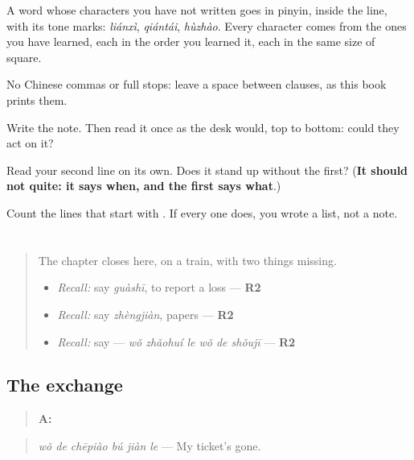 A word whose characters you have not written goes in pinyin, inside the line, with its tone marks: \emph{liánxì}, \emph{qiántái}, \emph{hùzhào}. Every character comes from the ones you have learned, each in the order you learned it, each in the same size of square.

No Chinese commas or full stops: leave a space between clauses, as this book prints them.

Write the note. Then read it once as the desk would, top to bottom: could they act on it?

\begin{tcolorbox}[breakable,colback=teal!4,colframe=teal!35!black,title={Before you move on}]
Read your second line on its own. Does it stand up without the first? (\textbf{It should not quite: it says when, and the first says what}.)

Count the lines that start with . If every one does, you wrote a list, not a note.
\end{tcolorbox}
\section[Practice]{}

\label{lesson:ZH-C285-practice}



\begin{quote}
The chapter closes here, on a train, with two things missing.

\begin{itemize}
\raggedright
  \item \emph{Recall:} say \emph{guàshī}, to report a loss — \textbf{R2}
  \item \emph{Recall:} say \emph{zhèngjiàn}, papers — \textbf{R2}
  \item \emph{Recall:} say  — \emph{wǒ zhǎohuí le wǒ de shǒujī} — \textbf{R2}
\end{itemize}
\end{quote}

\subsection*{The exchange}
\begin{quote}
\textbf{A:} 
\end{quote}

\begin{quote}
\emph{wǒ de chēpiào bú jiàn le} — My ticket's gone.
\end{quote}

